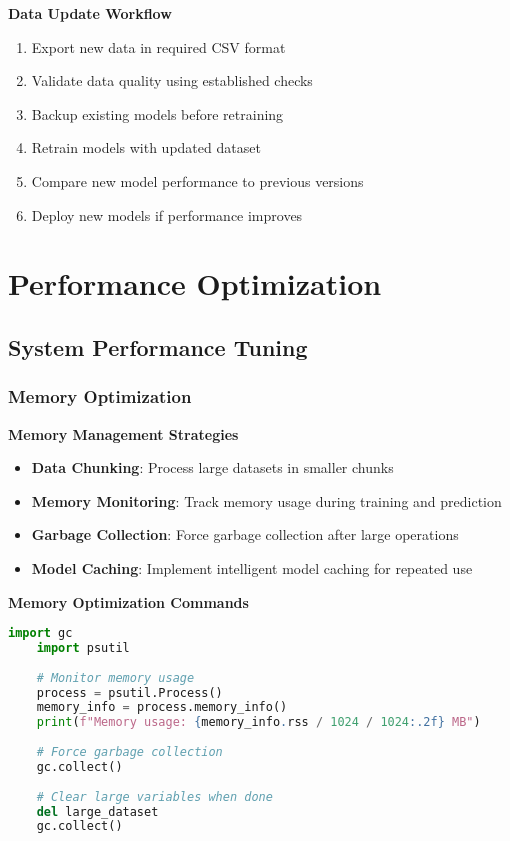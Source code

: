 \textbf{Data Update Workflow}
\begin{enumerate}
	\item Export new data in required CSV format
	\item Validate data quality using established checks
	\item Backup existing models before retraining
	\item Retrain models with updated dataset
	\item Compare new model performance to previous versions
	\item Deploy new models if performance improves
\end{enumerate}

\section{Performance Optimization}

\subsection{System Performance Tuning}

\subsubsection{Memory Optimization}

\textbf{Memory Management Strategies}
\begin{itemize}
	\item \textbf{Data Chunking}: Process large datasets in smaller chunks
	\item \textbf{Memory Monitoring}: Track memory usage during training and prediction
	\item \textbf{Garbage Collection}: Force garbage collection after large operations
	\item \textbf{Model Caching}: Implement intelligent model caching for repeated use
\end{itemize}

\textbf{Memory Optimization Commands}
\begin{lstlisting}[language=python, basicstyle=\color{blue}]
	import gc
	import psutil
	
	# Monitor memory usage
	process = psutil.Process()
	memory_info = process.memory_info()
	print(f"Memory usage: {memory_info.rss / 1024 / 1024:.2f} MB")
	
	# Force garbage collection
	gc.collect()
	
	# Clear large variables when done
	del large_dataset
	gc.collect()
\end{lstlisting}

